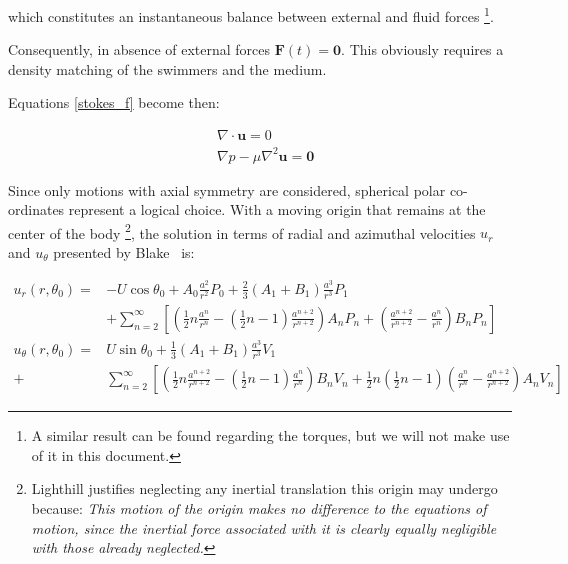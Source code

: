 which constitutes an instantaneous balance between external and fluid forces \footnote{A similar result can be found regarding the torques, but we will not make use of it in this document.}.

Consequently, in absence of external forces $\mathbf{F}(t) = \mathbf{0}$. This obviously requires a density matching of the swimmers and the medium.

Equations \ref{stokes_f} become then:

\begin{equation}
\begin{aligned} & \nabla \cdot \mathbf{u}=0 \\
& \nabla p-\mu \nabla^{2} \mathbf{u}=\mathbf{0} \label{stokes_f} \end{aligned}
\end{equation}

Since only motions with axial symmetry are considered, spherical polar co-ordinates represent a logical choice. With a moving origin that remains at the center of the body \footnote{Lighthill justifies neglecting any inertial translation this origin may undergo because: \textit{This motion of the origin makes no difference to the equations of motion, since the inertial force associated with it is clearly equally negligible with those already neglected.}}, the solution in terms of radial and azimuthal velocities $u_r$ and $u_\theta$ presented by Blake~\cite{Blake} is:

\begin{equation}
\begin{aligned} u_{r}\left(r, \theta_{0}\right)=&-U \cos \theta_{0}+A_{0} \frac{a^{2}}{r^{2}} P_{0}+\frac{2}{3}\left(A_{1}+B_{1}\right) \frac{a^{3}}{r^{3}} P_{1} \\ &+\sum_{n=2}^{\infty}\left[\left(\frac{1}{2} n \frac{a^{n}}{r^{n}}-\left(\frac{1}{2} n-1\right) \frac{a^{n+2}}{r^{n+2}}\right) A_{n} P_{n}+\left(\frac{a^{n+2}}{r^{n+2}}-\frac{a^{n}}{r^{n}}\right) B_{n} P_{n}\right] \\ u_{\theta}\left(r, \theta_{0}\right)=& U \sin \theta_{0}+\frac{1}{3}\left(A_{1}+B_{1}\right) \frac{a^{3}}{r^{3}} V_{1} \\+& \sum_{n=2}^{\infty}\left[\left(\frac{1}{2} n \frac{a^{n+2}}{r^{n+2}}-\left(\frac{1}{2} n-1\right) \frac{a^{n}}{r^{n}}\right) B_{n} V_{n}+\frac{1}{2} n\left(\frac{1}{2} n-1\right)\left(\frac{a^{n}}{r^{n}}-\frac{a^{n+2}}{r^{n+2}}\right) A_{n} V_{n}\right] \end{aligned}
\label{stokes_sol_uv}
\end{equation}

